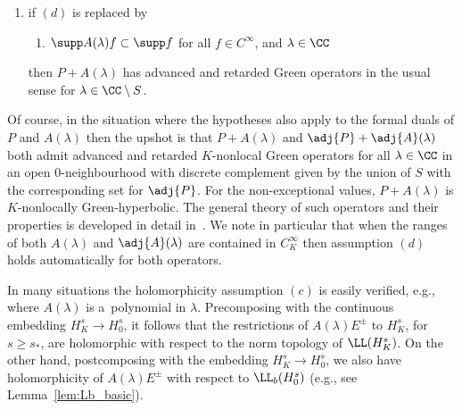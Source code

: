 \begin{Theorem}
\begin{enumerate}
 		\item[$(E)$]%
 if $(d)$ is replaced by
 		\begin{enumerate}
 			\item[$(d')$] $\supp A(\lambda)f\subset \supp f$ for all $f\in C^\infty$, and $\lambda\in\CC$
 		\end{enumerate}
 		then $P+ A(\lambda)$ has advanced and retarded Green operators in the usual sense
 		for $\lambda\in\CC\setminus S$.
 	\end{enumerate}
 \end{Theorem}
 Of course, in the situation where the hypotheses also apply to the formal duals of $P$ and $A(\lambda)$ then the upshot is that $P+ A(\lambda)$ and $\adj{P}+\adj{A}(\lambda)$
 both admit advanced and retarded $K$-nonlocal Green operators for all
 $\lambda\in\CC$ in an open $0$-neighbourhood with discrete complement given by the union of $S$ with the corresponding set for $\adj{P}$. For the non-exceptional values, $P+A(\lambda)$ is $K$-nonlocally Green-hyperbolic. The general theory of such operators and their properties is developed in detail in~\cite{FewVer:20xx}. We note in particular that when
 the ranges of both $A(\lambda)$ and $\adj{A}(\lambda)$ are contained in $C^\infty_K$ then assumption $(d)$ holds automatically for both operators.

 In many situations the holomorphicity assumption $(c)$ is easily verified, e.g., where $A(\lambda)$ is a~polynomial in $\lambda$. Precomposing with the continuous embedding $H^s_K\to H^s_0$, it follows that the restrictions of $A(\lambda)E^\pm$ to $H^s_K$, for $s\ge s_*$, are holomorphic with respect to the norm topology
 of $\LL(H^s_K)$. On the other hand, postcomposing with the embedding $H^s_K\to H^s_0$, we also have holomorphicity of $A(\lambda)E^\pm$ with respect to
 $\LL_b(H^s_0)$ (e.g., see Lemma~\ref{lem:Lb_basic}).
